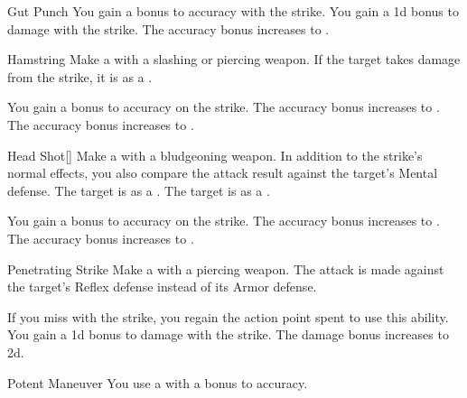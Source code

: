 {\begin{ability}{Gut Punch}
                \rankline
                 You gain a  bonus to accuracy with the strike.
                 You gain a \plus1d bonus to damage with the strike.
                 The accuracy bonus increases to .
            \end{ability}

            \begin{ability}{Hamstring}
                Make a  with a slashing or piercing weapon.
                If the target takes damage from the strike, it is  as a .

                \rankline
                 You gain a  bonus to accuracy on the strike.
                 The accuracy bonus increases to .
                 The accuracy bonus increases to .
            \end{ability}

            \begin{ability}{Head Shot}[]
                Make a  with a bludgeoning weapon.
                In addition to the strike's normal effects, you also compare the attack result against the target's Mental defense.
                \hit The target is  as a .
                \crit The target is  as a .

                \rankline
                 You gain a  bonus to accuracy on the strike.
                 The accuracy bonus increases to .
                 The accuracy bonus increases to .
            \end{ability}

            \begin{ability}{Penetrating Strike}
                Make a  with a piercing weapon.
                The attack is made against the target's Reflex defense instead of its Armor defense.

                \rankline
                 If you miss with the strike, you regain the action point spent to use this ability.
                 You gain a \plus1d bonus to damage with the strike.
                 The damage bonus increases to \plus2d.
            \end{ability}

            \begin{ability}{Potent Maneuver}
                You use a  with a  bonus to accuracy.


\end{ability}}

